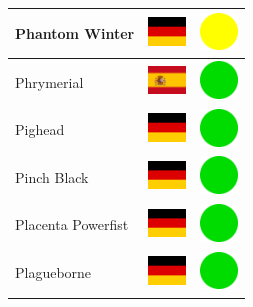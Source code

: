 \documentclass[12pt, a4paper, twoside]{report}
\begin{document}
\begin{center}
\begin{longtable}{|p{5cm}|p{2cm}|p{2cm}|}
 Phantom Winter                                             & \includegraphics[width=1cm]{../img/flags/de} &   \includegraphics[width=1cm]{../likes/m} \\ \hline
 Phrymerial                                                 & \includegraphics[width=1cm]{../img/flags/es} &   \includegraphics[width=1cm]{../likes/y} \\ \hline
 Pighead                                                    & \includegraphics[width=1cm]{../img/flags/de} &   \includegraphics[width=1cm]{../likes/y} \\ \hline
 Pinch Black                                                & \includegraphics[width=1cm]{../img/flags/de} &   \includegraphics[width=1cm]{../likes/y} \\ \hline
 Placenta Powerfist                                         & \includegraphics[width=1cm]{../img/flags/de} &   \includegraphics[width=1cm]{../likes/y} \\ \hline
 Plagueborne                                                & \includegraphics[width=1cm]{../img/flags/de} &   \includegraphics[width=1cm]{../likes/y} \\ \hline

\end{longtable}
\end{center}
\end{document}
